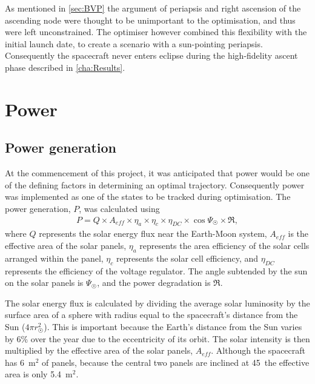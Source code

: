 
As mentioned in \autoref{sec:BVP} the argument of periapsis and right ascension of the ascending node were thought to be unimportant to the optimisation, and thus were left unconstrained. The optimiser however combined this flexibility with the initial launch date, to create a scenario with a sun-pointing periapsis. Consequently the spacecraft never enters eclipse during the high-fidelity ascent phase described in \autoref{cha:Results}.

\section{Power}\label{sec:Vehicle-power}

\subsection{Power generation} \label{sub:Power-generation}

At the commencement of this project, it was anticipated that power would be one of the defining factors in determining an optimal trajectory. Consequently power was implemented as one of the states to be tracked during optimisation. The power generation, $P$, was calculated using 
\begin{gather} \label{eq:Power-generation}
P = Q\times A_{eff}\times\eta_a\times\eta_c\times\eta_{DC}\times\cos\Psi_\Sun\times\mathfrak{R},
\end{gather}
where $Q$ represents the solar energy flux near the Earth-Moon system, $A_{eff}$ is the effective area of the solar panels, $\eta_a$ represents the area efficiency of the solar cells arranged within the panel, $\eta_c$ represents the solar cell efficiency, and $\eta_{DC}$ represents the efficiency of the voltage regulator. The angle subtended by the sun on the solar panels is $\Psi_\Sun$, and the power degradation is $\mathfrak{R}$.

The solar energy flux is calculated by dividing the average solar luminosity \parencite[$3.846\times10^{26}$ W,][]{Montenbruck2000} by the surface area of a sphere with radius equal to the spacecraft's distance from the Sun ($4\pi r_\Sun^2$). This is important because the Earth's distance from the Sun varies by 6\% over the year \parencite{Montenbruck2000} due to the eccentricity of its orbit. The solar intensity is then multiplied by the effective area of the solar panels, $A_{eff}$. Although the spacecraft has 6~m$^2$ of panels, because the central two panels are inclined at 45\degrees\ the effective area is only 5.4~m$^2$.

